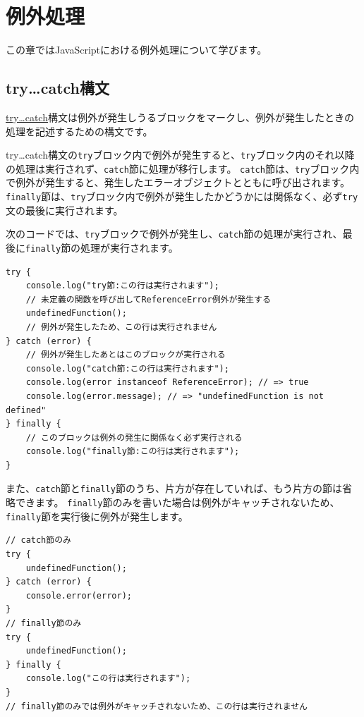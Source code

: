 \hypertarget{error-handling}{%
\chapter{例外処理}\label{error-handling}}
\thispagestyle{frontheadings}

この章ではJavaScriptにおける例外処理について学びます。

\hypertarget{try-catch}{%
\section{try\ldots{}catch構文}\label{try-catch}}

\href{https://developer.mozilla.org/ja/docs/Web/JavaScript/Reference/Statements/try...catch}{try\ldots{}catch}構文は例外が発生しうるブロックをマークし、例外が発生したときの処理を記述するための構文です。

try\ldots{}catch構文の\texttt{try}ブロック内で例外が発生すると、\texttt{try}ブロック内のそれ以降の処理は実行されず、\texttt{catch}節に処理が移行します。
\texttt{catch}節は、\texttt{try}ブロック内で例外が発生すると、発生したエラーオブジェクトとともに呼び出されます。
\texttt{finally}節は、\texttt{try}ブロック内で例外が発生したかどうかには関係なく、必ず\texttt{try}文の最後に実行されます。

次のコードでは、\texttt{try}ブロックで例外が発生し、\texttt{catch}節の処理が実行され、最後に\texttt{finally}節の処理が実行されます。

\begin{lstlisting}
try {
    console.log("try節:この行は実行されます");
    // 未定義の関数を呼び出してReferenceError例外が発生する
    undefinedFunction();
    // 例外が発生したため、この行は実行されません
} catch (error) {
    // 例外が発生したあとはこのブロックが実行される
    console.log("catch節:この行は実行されます");
    console.log(error instanceof ReferenceError); // => true
    console.log(error.message); // => "undefinedFunction is not defined"
} finally {
    // このブロックは例外の発生に関係なく必ず実行される
    console.log("finally節:この行は実行されます");
}
\end{lstlisting}

また、\texttt{catch}節と\texttt{finally}節のうち、片方が存在していれば、もう片方の節は省略できます。
\texttt{finally}節のみを書いた場合は例外がキャッチされないため、\texttt{finally}節を実行後に例外が発生します。

\begin{lstlisting}
// catch節のみ
try {
    undefinedFunction();
} catch (error) {
    console.error(error);
}
// finally節のみ
try {
    undefinedFunction();
} finally {
    console.log("この行は実行されます");
}
// finally節のみでは例外がキャッチされないため、この行は実行されません
\end{lstlisting}

